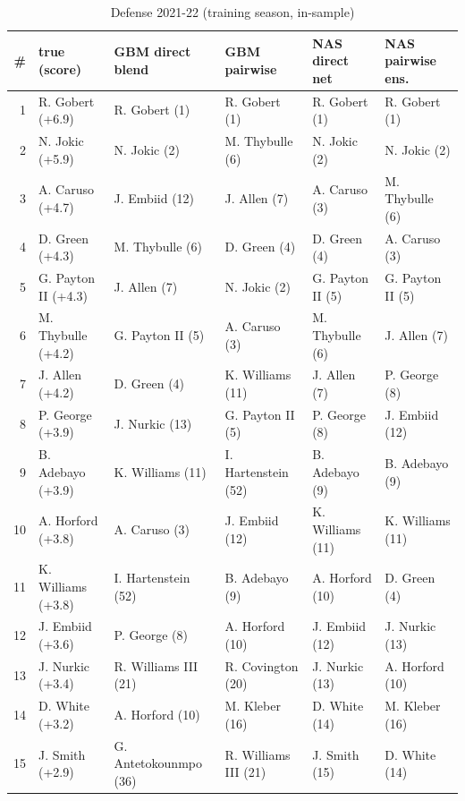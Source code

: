 \documentclass[10pt]{article}
\begin{document}
\begin{table}[ht]\centering\scriptsize
\caption{Defense 2021-22 (training season, in-sample)}
\begin{tabular}{rlllll}
\toprule
\# & true (score) & GBM direct blend & GBM pairwise & NAS direct net & NAS pairwise ens. \\
\midrule
1 & R. Gobert (+6.9) & R. Gobert (1) & R. Gobert (1) & R. Gobert (1) & R. Gobert (1) \\
2 & N. Jokic (+5.9) & N. Jokic (2) & M. Thybulle (6) & N. Jokic (2) & N. Jokic (2) \\
3 & A. Caruso (+4.7) & J. Embiid (12) & J. Allen (7) & A. Caruso (3) & M. Thybulle (6) \\
4 & D. Green (+4.3) & M. Thybulle (6) & D. Green (4) & D. Green (4) & A. Caruso (3) \\
5 & G. Payton II (+4.3) & J. Allen (7) & N. Jokic (2) & G. Payton II (5) & G. Payton II (5) \\
6 & M. Thybulle (+4.2) & G. Payton II (5) & A. Caruso (3) & M. Thybulle (6) & J. Allen (7) \\
7 & J. Allen (+4.2) & D. Green (4) & K. Williams (11) & J. Allen (7) & P. George (8) \\
8 & P. George (+3.9) & J. Nurkic (13) & G. Payton II (5) & P. George (8) & J. Embiid (12) \\
9 & B. Adebayo (+3.9) & K. Williams (11) & I. Hartenstein (52) & B. Adebayo (9) & B. Adebayo (9) \\
10 & A. Horford (+3.8) & A. Caruso (3) & J. Embiid (12) & K. Williams (11) & K. Williams (11) \\
11 & K. Williams (+3.8) & I. Hartenstein (52) & B. Adebayo (9) & A. Horford (10) & D. Green (4) \\
12 & J. Embiid (+3.6) & P. George (8) & A. Horford (10) & J. Embiid (12) & J. Nurkic (13) \\
13 & J. Nurkic (+3.4) & R. Williams III (21) & R. Covington (20) & J. Nurkic (13) & A. Horford (10) \\
14 & D. White (+3.2) & A. Horford (10) & M. Kleber (16) & D. White (14) & M. Kleber (16) \\
15 & J. Smith (+2.9) & G. Antetokounmpo (36) & R. Williams III (21) & J. Smith (15) & D. White (14) \\
\bottomrule
\end{tabular}
\end{table}
\end{document}
